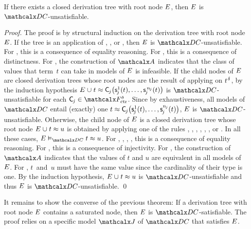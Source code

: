 \begin{theorem}%
\label{thm:rs}%
\afterDot
If there exists a closed derivation tree with root node\/ $E$, then\/ $E$ is $\thD$-unsatisfiable.
\end{theorem}
\begin{proof}
The proof is by structural induction on the derivation tree with root node $E$.
If the tree is an application of , , or ,
then $E$ is $\thD$-unsatisfiable.
For , this is a consequence of equality reasoning.
For , this is a consequence of distinctness.
For , the construction of $\Val$ indicates that the class of values that term~$t$ can take in models of $E$ is infeasible.
If the child nodes of $E$ are closed derivation trees
whose root nodes are the result of applying  on $t\typ{\delta}$,
by the induction hypothesis $E \mathrel\cup t \approx \smash{\textsf{C}_{\kern-0.083333em j}\bigl( \textsf{s}^1_{\kern-0.083333em j}( t ), \ldots, \textsf{s}^{\,\smash{n_{\kern-0.083333em j}}}_{\kern-0.083333em j}( t ) \bigr)}$ is
$\thD$-unsatisfiable
for each $\const C_{\negvthinspace j} \in \smash{\Ctr^\delta}$.
Since by exhaustiveness, all models of $\thD$ entail (exactly) one
$t \approx \textsf{C}_{\kern-0.083333em j}\bigl(\textsf{s}^1_{\kern-0.083333em j}( t ), \ldots,\textsf{s}^{n_{\kern-0.083333em j}}_{\kern-0.083333em j}( t )\bigr)$,
$E$ is $\thD$-unsatisfiable.
Otherwise, the child node of $E$ is a closed derivation tree
whose root node $E \mathrel\cup t \approx u$ is obtained by applying one of the rules , , , , , , or .
In all these cases, $\Ec \models_{\thD} t \teq u$.
For , , , , this is a consequence of equality reasoning.
For , this is a consequence of injectivity.
For , the construction of $\Val$ indicates that the values of $t$ and $u$ are equivalent in all models of $E$.
For , $t$~and~$u$ must have the same value since the cardinality of their type is one.
By the induction hypothesis, $E \mathrel\cup t \approx u$ is $\thD$-unsatisfiable
and thus $E$ is $\thD$-unsatisfiable.
\qed
\end{proof}

It remains to show the converse of the previous theorem: If a derivation tree
with root node $E$ contains a saturated node, then $E$ is
$\thD$-satisfiable.
The proof relies on a specific model $\J$ of $\thD$ that satisfies $E$.

